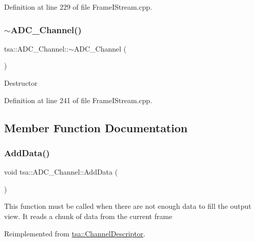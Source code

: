 Definition at line 229 of file Frame\+I\+Stream.\+cpp.

\mbox{\label{classtsa_1_1_a_d_c___channel_a0f9c5bbb98da25e712d4f6f8c078e658}} 
\subsubsection{\texorpdfstring{$\sim$\+A\+D\+C\+\_\+\+Channel()}{~ADC\_Channel()}}
{\footnotesize\ttfamily tsa\+::\+A\+D\+C\+\_\+\+Channel\+::$\sim$\+A\+D\+C\+\_\+\+Channel (\begin{DoxyParamCaption}{ }\end{DoxyParamCaption})\hspace{0.3cm}{\ttfamily [virtual]}}

Destructor 

Definition at line 241 of file Frame\+I\+Stream.\+cpp.



\subsection{Member Function Documentation}
\mbox{\label{classtsa_1_1_a_d_c___channel_a23052bc47591e46246701ec0573c7902}} 
\subsubsection{\texorpdfstring{Add\+Data()}{AddData()}}
{\footnotesize\ttfamily void tsa\+::\+A\+D\+C\+\_\+\+Channel\+::\+Add\+Data (\begin{DoxyParamCaption}{ }\end{DoxyParamCaption})\hspace{0.3cm}{\ttfamily [virtual]}}

This function must be called when there are not enough data to fill the output view. It reads a chunk of data from the current frame 

Reimplemented from \hyperlink{classtsa_1_1_channel_descriptor_aa1e001a5e712415cd4e9d66846914a56}{tsa\+::\+Channel\+Descriptor}.



